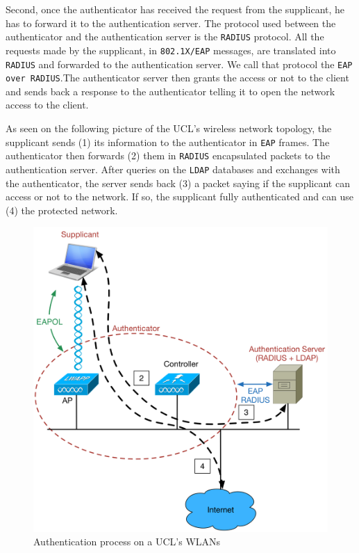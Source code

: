 Second, once the authenticator has received the request from the supplicant, he has to forward it to the authentication server. The protocol used between the authenticator and the authentication server is the \texttt{RADIUS} protocol. All the requests made by the supplicant, in \texttt{802.1X/EAP} messages, are translated into \texttt{RADIUS} and forwarded to the authentication server. We call that protocol the \texttt{EAP over RADIUS}.The authenticator server then grants the access or not to the client and sends back a response to the authenticator telling it to open the network access to the client.

As seen on the following picture of the UCL's wireless network topology, the supplicant sends (1) its information to the authenticator in \texttt{EAP} frames. The authenticator then forwards (2) them in \texttt{RADIUS} encapsulated packets to the authentication server. After queries on the \texttt{LDAP} databases and exchanges with the authenticator, the server sends back (3) a packet saying if the supplicant can access or not to the network. If so, the supplicant fully authenticated and can use (4) the protected network.

\begin{figure}[H]
	\includegraphics[width=.9\linewidth]{Pictures/Chapter2/topology.png}
	\caption{Authentication process on a UCL's WLANs}
\end{figure}



